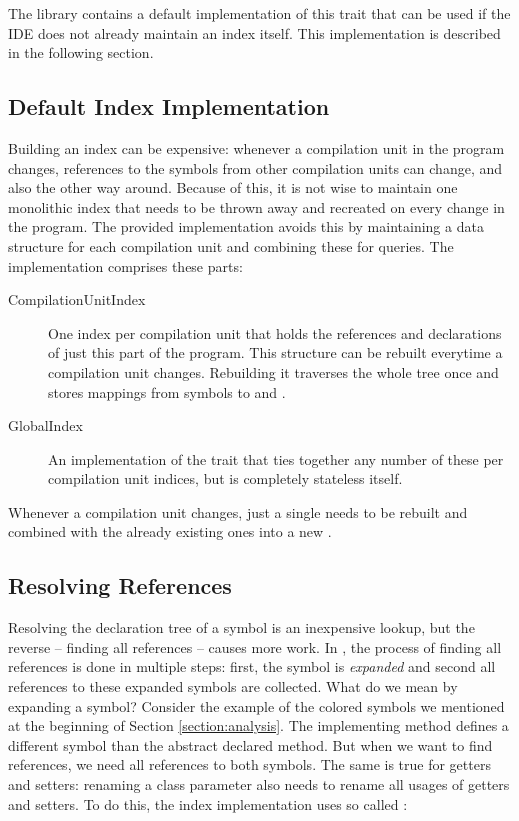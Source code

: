 The library contains a default implementation of this trait that can be used if the IDE does not already maintain an index itself. This implementation is described in the following section.

\subsection{Default Index Implementation}

Building an index can be expensive: whenever a compilation unit in the program changes, references to the symbols from other compilation units can change, and also the other way around. Because of this, it is not wise to maintain one monolithic index that needs to be thrown away and recreated on every change in the program. The provided implementation avoids this by maintaining a data structure for each compilation unit and combining these for queries. The implementation comprises these parts:

\begin{description}
 \item[CompilationUnitIndex] One index per compilation unit that holds the references and declarations of just this part of the program. This structure can be rebuilt everytime a compilation unit changes. Rebuilding it traverses the whole tree once and stores mappings from symbols to  and .
 \item[GlobalIndex] An implementation of the  trait that ties together any number of these per compilation unit indices, but is completely stateless itself.
\end{description}

Whenever a compilation unit changes, just a single  needs to be rebuilt and combined with the already existing ones into a new .

\subsection{Resolving References}

Resolving the declaration tree of a symbol is an inexpensive lookup, but the reverse -- finding all references -- causes more work. In , the process of finding all references is done in multiple steps: first, the symbol is \textit{expanded} and second all references to these expanded symbols are collected. What do we mean by expanding a symbol? Consider the example of the colored symbols we mentioned at the beginning of Section \ref{section:analysis}. The implementing method defines a different symbol than the abstract declared method. But when we want to find references, we need all references to both symbols. The same is true for getters and setters: renaming a class parameter also needs to rename all usages of getters and setters. To do this, the index implementation uses so called :


